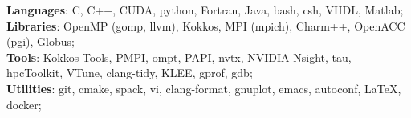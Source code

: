 \selectfont
{\textbf{Languages}: C, C++, CUDA, python, Fortran, Java,  bash, csh, VHDL, Matlab};\\
{\textbf{Libraries}:  OpenMP (gomp, llvm), Kokkos, MPI (mpich), Charm++, OpenACC (pgi), Globus}; \\
{\textbf{Tools}: Kokkos Tools, PMPI, ompt, PAPI, nvtx, NVIDIA Nsight, tau, hpcToolkit, VTune, clang-tidy, KLEE,  gprof, gdb}; \\
{\textbf{Utilities}: git, cmake, spack, vi, clang-format, gnuplot, emacs, autoconf, LaTeX, docker};\\